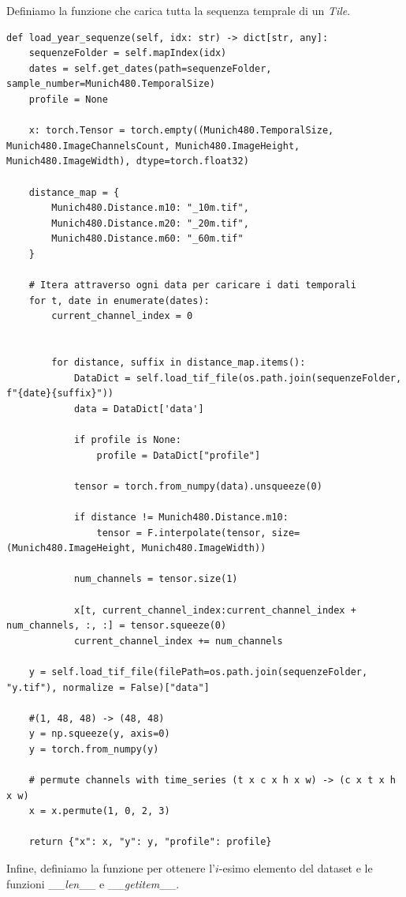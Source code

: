 Definiamo la funzione che carica tutta la sequenza temprale di un \textit{Tile}.
\begin{lstlisting}
def load_year_sequenze(self, idx: str) -> dict[str, any]:
    sequenzeFolder = self.mapIndex(idx)
    dates = self.get_dates(path=sequenzeFolder, sample_number=Munich480.TemporalSize)
    profile = None
    
    x: torch.Tensor = torch.empty((Munich480.TemporalSize, Munich480.ImageChannelsCount, Munich480.ImageHeight, Munich480.ImageWidth), dtype=torch.float32)
    
    distance_map = {
        Munich480.Distance.m10: "_10m.tif",
        Munich480.Distance.m20: "_20m.tif",
        Munich480.Distance.m60: "_60m.tif"
    }

    # Itera attraverso ogni data per caricare i dati temporali
    for t, date in enumerate(dates):
        current_channel_index = 0 

        
        for distance, suffix in distance_map.items():
            DataDict = self.load_tif_file(os.path.join(sequenzeFolder, f"{date}{suffix}"))
            data = DataDict['data']
            
            if profile is None:
                profile = DataDict["profile"]
            
            tensor = torch.from_numpy(data).unsqueeze(0) 
            
            if distance != Munich480.Distance.m10:
                tensor = F.interpolate(tensor, size=(Munich480.ImageHeight, Munich480.ImageWidth))
            
            num_channels = tensor.size(1)
            
            x[t, current_channel_index:current_channel_index + num_channels, :, :] = tensor.squeeze(0)
            current_channel_index += num_channels

    y = self.load_tif_file(filePath=os.path.join(sequenzeFolder, "y.tif"), normalize = False)["data"]
    
    #(1, 48, 48) -> (48, 48)
    y = np.squeeze(y, axis=0)
    y = torch.from_numpy(y)

    # permute channels with time_series (t x c x h x w) -> (c x t x h x w)
    x = x.permute(1, 0, 2, 3)

    return {"x": x, "y": y, "profile": profile}
\end{lstlisting}
Infine, definiamo la funzione per ottenere l'$i$-esimo elemento del dataset  
e le funzioni \_\_\textit{len}\_\_ e \_\_\textit{getitem}\_\_.
